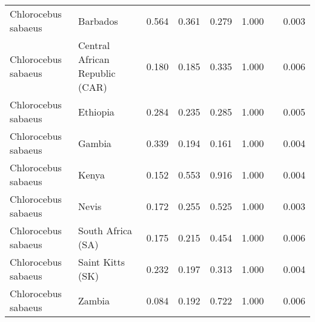 \begin{center}
\begin{adjustbox}{width = 1\textwidth}
\begin{tabular}{|l|l|r|r|r|r|r|}
 Chlorocebus sabaeus &                        Barbados &                                              0.564 &                                              0.361 &                0.279 &                                  1.000~~ &              0.003 \\
 Chlorocebus sabaeus &  Central African Republic (CAR) &                                              0.180 &                                              0.185 &                0.335 &                                  1.000~~ &              0.006 \\
 Chlorocebus sabaeus &                        Ethiopia &                                              0.284 &                                              0.235 &                0.285 &                                  1.000~~ &              0.005 \\
 Chlorocebus sabaeus &                          Gambia &                                              0.339 &                                              0.194 &                0.161 &                                  1.000~~ &              0.004 \\
 Chlorocebus sabaeus &                           Kenya &                                              0.152 &                                              0.553 &                0.916 &                                  1.000~~ &              0.004 \\
 Chlorocebus sabaeus &                           Nevis &                                              0.172 &                                              0.255 &                0.525 &                                  1.000~~ &              0.003 \\
 Chlorocebus sabaeus &               South Africa (SA) &                                              0.175 &                                              0.215 &                0.454 &                                  1.000~~ &              0.006 \\
 Chlorocebus sabaeus &                Saint Kitts (SK) &                                              0.232 &                                              0.197 &                0.313 &                                  1.000~~ &              0.004 \\
 Chlorocebus sabaeus &                          Zambia &                                              0.084 &                                              0.192 &                0.722 &                                  1.000~~ &              0.006 \\

\end{tabular}
\end{adjustbox}
\end{center}
